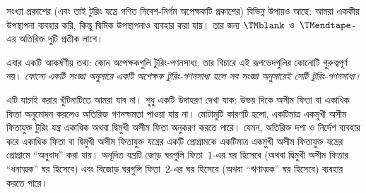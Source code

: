 \documentclass[../../../include/open-logic-section]{subfiles}
\begin{document}
সংখ্যা প্রকাশের (এবং তাই টুরিং যন্ত্রে গণিত নিবেশ-নির্গম অপেক্ষকটি
প্রকাশের) বিভিন্ন উপায়ও আছে: আমরা এককীয় উপস্থাপনা ব্যবহার করি, কিন্তু
দ্বিমিক উপস্থাপনাও ব্যবহার করা যায়। তার জন্য $\TMblank$ ও~$\TMendtape$-
এর অতিরিক্ত দুটি প্রতীক লাগে।

এবার একটি আকর্ষণীয় তথ্য: কোন অপেক্ষকগুলি টুরিং-গণনসাধ্য, তার বিচারে এই
রূপভেদগুলির কোনোটি গুরুত্বপূর্ণ নয়। \emph{কোনো একটি সংজ্ঞা অনুসারে একটি
অপেক্ষক টুরিং-গণনসাধ্য হলে সব সংজ্ঞা অনুসারেই সেটি টুরিং-গণনসাধ্য।}

এটি যাচাই করার খুঁটিনাটিতে আমরা যাব না। শুধু একটি উদাহরণ দেখা যাক: উভয়
দিকে অসীম ফিতা বা একাধিক ফিতা অনুমোদন করলেও অতিরিক্ত গণনক্ষমতা পাওয়া
যায় না। মোটামুটি কারণটি হলো, একটিমাত্র একমুখী অসীম ফিতাযুক্ত টুরিং যন্ত্র
একাধিক অথবা দ্বিমুখী অসীম ফিতা অনুকরণ করতে পারে। যেমন, অতিরিক্ত দশা ও
নির্দেশ ব্যবহার করে একাধিক ফিতা বা দ্বিমুখী অসীম ফিতাযুক্ত যন্ত্রের একটি
প্রোগ্রামকে একটিমাত্র একমুখী অসীম ফিতাযুক্ত যন্ত্রের প্রোগ্রামে
``অনুবাদ'' করা যায়। অনূদিত যন্ত্রটি জোড় ঘরগুলি ফিতা~$1$-এর ঘর হিসেবে
(অথবা দ্বিমুখী অসীম ফিতার ``ধনাত্মক'' ঘর হিসেবে) এবং বিজোড় ঘরগুলি
ফিতা~$2$-এর ঘর হিসেবে (অথবা ``ঋণাত্মক'' ঘর হিসেবে) ব্যবহার করতে পারে।
\end{document}
